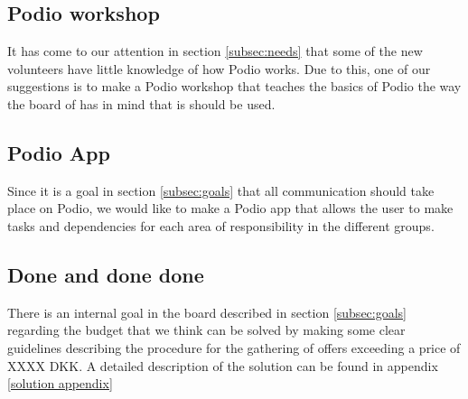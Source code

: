 \subsection{Podio workshop}
It has come to our attention in section \ref{subsec:needs} that
some of the new volunteers have little knowledge of how Podio works. Due to
this, one of our suggestions is to make a Podio workshop that teaches the basics
of Podio the way the board of \mil has in mind that is should be used.

\subsection{Podio App}
Since it is a goal in section \ref{subsec:goals} that all communication should take place
on Podio, we would like to make a Podio app that allows the user to make tasks
and dependencies for each area of responsibility in the different groups.

\subsection{Done and done done}
There is an internal goal in the board described in section \ref{subsec:goals} regarding the
budget that we think can be solved by making some clear guidelines describing
the procedure for the gathering of offers exceeding a price of XXXX DKK. A
detailed description of the solution can be found in appendix \ref{solution
appendix}


